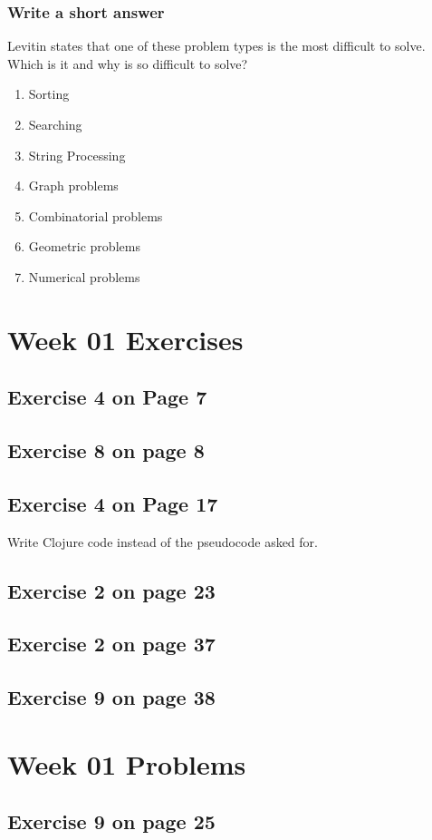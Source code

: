 \documentclass[12pt]{amsart}
\begin{document}
\subsubsection{Write a short answer}

Levitin states that one of these problem types is the most difficult to solve. Which is it and why is so difficult to solve?
\begin{enumerate}
	\item Sorting
	\item Searching
	\item String Processing
	\item Graph problems
	\item Combinatorial problems
	\item Geometric problems
	\item Numerical problems
\end{enumerate}
\section{Week 01 Exercises}
\subsection{Exercise 4 on Page 7}
\subsection{Exercise 8 on page 8}
\subsection{Exercise 4 on Page 17} Write Clojure code instead of the pseudocode asked for.
\subsection{Exercise 2 on page 23}
\subsection{Exercise 2 on page 37}
\subsection{Exercise 9 on page 38}
 
 
\section{Week 01 Problems}
\subsection{Exercise 9 on page 25} 
\end{document}
